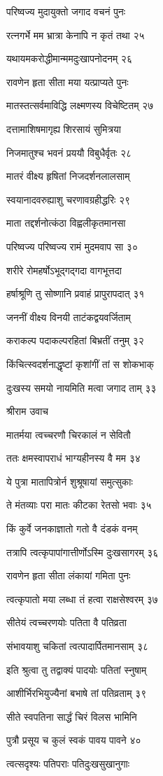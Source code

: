 परिष्वज्य मुदायुक्तो जगाद वचनं पुनः

रत्नगर्भे मम भ्रात्रा केनापि न कृतं तथा २५

यथायमकरोद्धीमान्ममदुःखापनोदनम् २६

रावणेन हृता सीता मया यत्प्राप्यते पुनः

मातस्तत्सर्वमाविद्धि लक्ष्मणस्य विचेष्टितम् २७

दत्तामाशिषमागृह्य शिरसायं सुमित्रया

निजमातुश्च भवनं प्रययौ विबुधैर्वृतः २८

मातरं वीक्ष्य हृषितां निजदर्शनलालसाम्

स्वयानादवरुह्याशु चरणावग्रहीद्धरिः २९

माता तद्दर्शनोत्कंठा विह्वलीकृतमानसा

परिष्वज्य परिष्वज्य रामं मुदमवाप सा ३०

शरीरे रोमहर्षोऽभूद्गद्गदा वागभूत्तदा

हर्षाश्रूणि तु सोष्णानि प्रवाहं प्रापुरापदात् ३१

जननीं वीक्ष्य विनयी ताटंकद्वयवर्जिताम्

कराकल्प पदाकल्परहितां बिभ्रतीं तनुम् ३२

किंचित्स्वदर्शनाद्धृष्टां कृशांगीं तां स शोकभाक्

दुःखस्य समयो नायमिति मत्वा जगाद ताम् ३३

श्रीराम उवाच

मातर्मया त्वच्चरणौ चिरकालं न सेवितौ

ततः क्षमस्वापराधं भाग्यहीनस्य वै मम ३४

ये पुत्रा मातापित्रोर्न शुश्रूषायां समुत्सुकाः

ते मंतव्याः परा मातः कीटका रेतसो भवाः ३५

किं कुर्वे जनकाज्ञातो गतो वै दंडकं वनम्

तत्रापि त्वत्कृपापांगात्तीर्णोऽस्मि दुःखसागरम् ३६

रावणेन हृता सीता लंकायां गमिता पुनः

त्वत्कृपातो मया लब्धा तं हत्वा राक्षसेश्वरम् ३७

सीतेयं त्वच्चरणयोः पतिता वै पतिव्रता

संभावयाशु चकितां त्वत्पादार्पितमानसाम् ३८

इति श्रुत्वा तु तद्वाक्यं पादयोः पतितां स्नुषाम्

आशीर्भिरभियुज्यैनां बभाषे तां पतिव्रताम् ३९

सीते स्वपतिना सार्द्धं चिरं विलस भामिनि

पुत्रौ प्रसूय च कुलं स्वकं पावय पावने ४०

त्वत्सदृश्यः पतिपराः पतिदुःखसुखानुगाः

